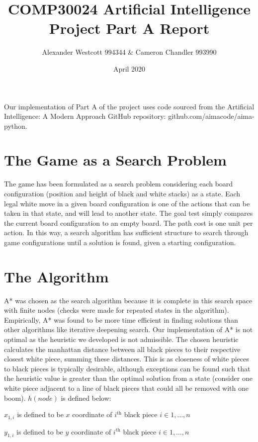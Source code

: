 \documentclass[a4paper,11pt]{article}
\author{Alexander Westcott 994344 \& Cameron Chandler 993990}
\title{COMP30024 Artificial Intelligence Project Part A Report}
\date{April 2020}
\begin{document}
\maketitle

\noindent Our implementation of Part A of the project uses code sourced from the
Artificial Intelligence: A Modern Approach GitHub repository: github.com/aimacode/aima-python.

\section*{The Game as a Search Problem}

The game has been formulated as a search problem considering each board configuration 
(position and height of black and white stacks) as a state. 
Each legal white move in a given board configuration is one 
of the actions that can be taken in that state, and will lead to another state. 
The goal test simply compares the current board configuration to an empty board. 
The path cost is one unit per action. In this way, a search algorithm has sufficient 
structure to search through game configurations until a solution is found, given a starting 
configuration. 

\section*{The Algorithm}
A* was chosen as the search algorithm because it is complete in this search space with 
finite nodes (checks were made for repeated states in the algorithm). 
Empirically, A* was found to be more time efficient in finding solutions than other algorithms like iterative deepening search. 
Our implementation of A* is not optimal as the heuristic we developed is not admissible. 
The chosen heuristic calculates the manhattan distance between all black pieces to their 
respective closest white piece, summing these distances. This is as closeness 
of white pieces to black pieces is typically desirable, although 
exceptions can be found such that the heuristic value is greater
than the optimal solution from a state (consider one white piece 
adjacent to a line of black pieces that could all be removed with one boom). 
$h(node)$ is defined below: \newline

$x_{1,i}$ is defined to be $x$ coordinate of $i^{\text{th}}$ black piece $i \in {1,\dots,n}$

$y_{1,i}$ is defined to be $y$ coordinate of $i^{\text{th}}$ black piece $i \in {1,\dots,n}$
\end{document}
